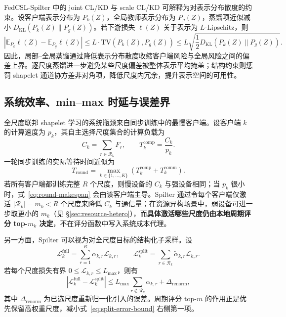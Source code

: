 \documentclass{article}
\begin{document}
FedCSL-Spilter 中的 joint CL/KD 与 scale CL/KD 可解释为对表示分布散度的约束。设客户端表示分布为 $P_k(Z)$，全局教师表示分布为 $P_g(Z)$，蒸馏项近似减小 $D_{\mathrm{KL}}(P_k(Z)\|P_g(Z))$。若下游损失 $\ell(Z)$ 关于表示为 $L$-Lipschitz，则
\begin{equation}
\left|
\mathbb{E}_{P_k}\ell(Z)-\mathbb{E}_{P_g}\ell(Z)
\right|
\leq
L\cdot \mathrm{TV}\!\left(P_k(Z),P_g(Z)\right)
\leq
L\sqrt{\frac{1}{2}D_{\mathrm{KL}}\!\left(P_k(Z)\|P_g(Z)\right)} .
\end{equation}
因此，局部--全局蒸馏通过降低表示分布散度收缩客户端风险与全局风险之间的偏差上界。逐尺度蒸馏进一步避免某些尺度偏差被整体表示平均掩盖；结构约束则惩罚 shapelet 通道协方差非对角项，降低尺度内冗余，提升表示空间的可用性。

\subsection{系统效率、min--max 时延与误差界}

全尺度联邦 shapelet 学习的系统瓶颈来自同步训练中的最慢客户端。设客户端 $k$ 的计算速度为 $p_k$，其自主选择尺度集合的计算负载为
\begin{equation}
C_k=\sum_{r\in\mathcal{R}_k}F_r,\qquad
T_k^{\mathrm{comp}}=\frac{C_k}{p_k}.
\end{equation}
一轮同步训练的实际等待时间近似为
\begin{equation}
T_{\mathrm{round}}=
\max_{k\in\{1,\ldots,K\}}
\left(T_k^{\mathrm{comp}}+T_k^{\mathrm{comm}}\right).
\label{eq:round-makespan}
\end{equation}
若所有客户端都训练完整 $R$ 个尺度，则慢设备的 $C_k$ 与强设备相同；当 $p_k$ 很小时，式~\eqref{eq:round-makespan} 会由该客户端主导。Spilter 通过令每个客户端仅激活 $|\mathcal{R}_k|=m_k<R$ 个尺度来降低 $C_k$ 与通信量；在资源异构场景中，弱设备可进一步取更小的 $m_k$（见 §\ref{sec:resource-hetero}），而\textbf{具体激活哪些尺度仍由本地周期评分 top-$m_k$ 决定}，不在评分函数中写入系统成本代理。

另一方面，Spilter 可以视为对全尺度目标的结构化子采样。设
\begin{equation}
\mathcal{L}_{k}^{\mathrm{full}}=\sum_{r=1}^{R}\alpha_{k,r}\mathcal{L}_{k,r},
\qquad
\mathcal{L}_{k}^{\mathrm{split}}=\sum_{r\in\mathcal{R}_k}\tilde{\alpha}_{k,r}\mathcal{L}_{k,r}.
\end{equation}
若每个尺度损失有界 $0\leq\mathcal{L}_{k,r}\leq L_{\max}$，则有
\begin{equation}
\left|\mathcal{L}_{k}^{\mathrm{full}}-\mathcal{L}_{k}^{\mathrm{split}}\right|
\leq
L_{\max}\sum_{r\notin\mathcal{R}_k}\alpha_{k,r}
 + \Delta_{\mathrm{renorm}},
\label{eq:split-error-bound}
\end{equation}
其中 $\Delta_{\mathrm{renorm}}$ 为已选尺度重新归一化引入的误差。周期评分 top-$m$ 的作用正是优先保留高权重尺度，减小式~\eqref{eq:split-error-bound} 右侧第一项。
\end{document}
